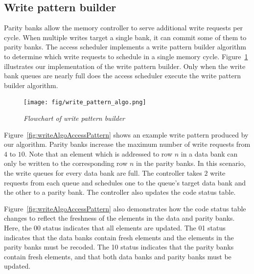 \subsection{Write pattern builder}
\label{sec:writeCodingAlgo}
Parity banks allow the memory controller to serve additional write requests per cycle. When multiple writes target a single bank, it can commit some of them to parity banks. The access scheduler implements a write pattern builder algorithm to determine which write requests to schedule in a single memory cycle. Figure~\ref{fig:writeFlow} illustrates our implementation of the write pattern builder. Only when the write bank queues are nearly full does the access scheduler execute the write pattern builder algorithm. 


\begin{figure}[htbp]
\centering
	\texttt{[image: fig/write\_pattern\_algo.png]}
	\caption{\it{Flowchart of write pattern builder}}
	\label{fig:writeFlow}
\end{figure}


Figure~\ref{fig:writeAlgoAccessPattern} shows an example write pattern produced by our algorithm. Parity banks increase the maximum number of write requests from $4$ to $10$. Note that an element which is addressed to row $n$ in a data bank can only be written to the corresponding row $n$ in the parity banks. In this scenario, the write queues for every data bank are full. The controller takes $2$ write requests from each queue and schedules one to the queue's target data bank and the other to a parity bank. The controller also updates the code status table.

Figure~\ref{fig:writeAlgoAccessPattern} also demonstrates how the code status table changes to reflect the freshness of the elements in the data and parity banks. Here, the 00 status indicates that all elements are updated. The 01 status indicates that the data banks contain fresh elements and the elements in the parity banks must be recoded. The 10 status indicates that the parity banks contain fresh elements, and that both data banks and parity banks must be updated.


